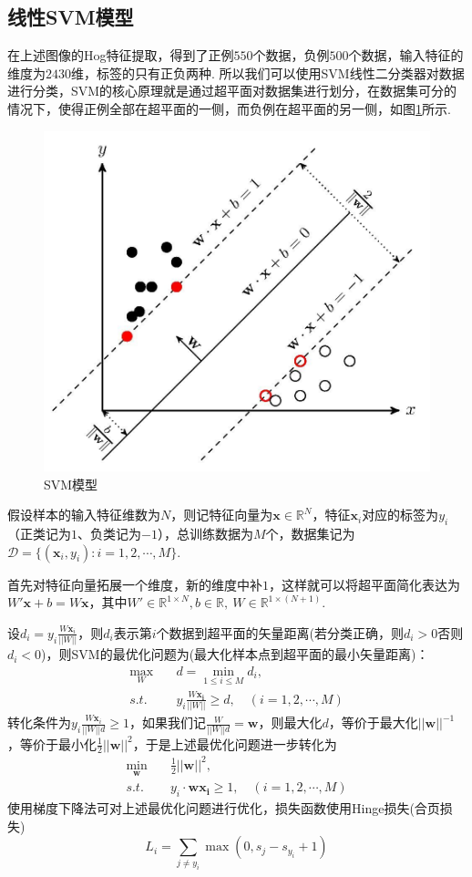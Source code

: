 \documentclass[12pt, a4paper, oneside]{ctexart}
\numberwithin{equation}{section}  %
\let\leq=\leqslant %
\let\geq=\geqslant %
\def\bd{\boldsymbol}        %
\def\R{\mathbb{R}}          %
\def\D{\mathcal{D}}         %
\def\add{\vspace{1ex}}      %
\def\del{\vspace{-1.5ex}}   %
\begin{document}
\subsection{线性SVM模型}
在上述图像的Hog特征提取，得到了正例$550$个数据，负例$500$个数据，输入特征的维度为$2430$维，标签的只有正负两种. 所以我们可以使用SVM线性二分类器对数据进行分类，SVM的核心原理就是通过超平面对数据集进行划分，在数据集可分的情况下，使得正例全部在超平面的一侧，而负例在超平面的另一侧，如图\ref{fig-SVM}所示. 
\begin{figure}[htbp]
  \centering
  \includegraphics[scale=1]{SVM.jpg}
  \caption{SVM模型}
  \label{fig-SVM}
\end{figure}
假设样本的输入特征维数为$N$，则记特征向量为$\bd{x}\in \R^N$，特征$\bd{x}_i$对应的标签为$y_i$（正类记为$1$、负类记为$-1$），总训练数据为$M$个，数据集记为$\D = \{(\bd{x}_i, y_i):i=1,2,\cdots,M\}$. 

首先对特征向量拓展一个维度，新的维度中补$1$，这样就可以将超平面简化表达为$W'\bd{x}+b = W\bd{x}$，其中$W'\in\R^{1\times N},b\in\R,\ W\in\R^{1\times(N+1)}$.

设$d_i = y_i\frac{W\bd{x}_i}{||W||}$，则$d_i$表示第$i$个数据到超平面的矢量距离(若分类正确，则$d_i>0$否则$d_i<0$)，则SVM的最优化问题为(最大化样本点到超平面的最小矢量距离)：\del
\begin{align*}
  \max_{W}&\quad d = \min_{1\leq i\leq M}d_i,\\
  s.t.&\quad y_i\frac{W\bd{x_i}}{||W||}\geq d,\quad (i=1,2,\cdots, M)
\end{align*}
转化条件为$y_i\frac{W\bd{x}_i}{||W||d}\geq 1$，\add 如果我们记$\frac{W}{||W||d} = \bd{w}$，则最大化$d$，等价于最大化$||\bd{w}||^{-1}$，等价于最小化$\frac{1}{2}||\bd{w}||^2$，于是上述最优化问题进一步转化为\del
\begin{align*}
  \min_{\bd{w}}&\quad \frac{1}{2}||\bd{w}||^2,\\
  s.t.&\quad y_i\cdot\bd{w}\bd{x_i}\geq 1,\quad (i=1,2,\cdots, M)
\end{align*}
使用梯度下降法可对上述最优化问题进行优化，损失函数使用Hinge损失(合页损失)
\begin{equation*}
  L_i = \sum_{j\neq y_i}\max(0, s_j-s_{y_i}+1)
\end{equation*}
\end{document}
